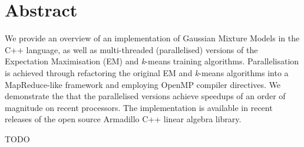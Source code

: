 \section*{Abstract}

We provide an overview of an implementation of Gaussian Mixture Models in the C++ language,
as well as multi-threaded (parallelised) versions of the Expectation Maximisation (EM) and {\it k}-means training algorithms.
Parallelisation is achieved through refactoring the original EM and {\it k}-means algorithms into a MapReduce-like framework
and employing OpenMP compiler directives.
We demonstrate the that the parallelised versions achieve speedups of an order of magnitude on recent processors.
The implementation is available in recent releases of the open source Armadillo C++ linear algebra library.

TODO

